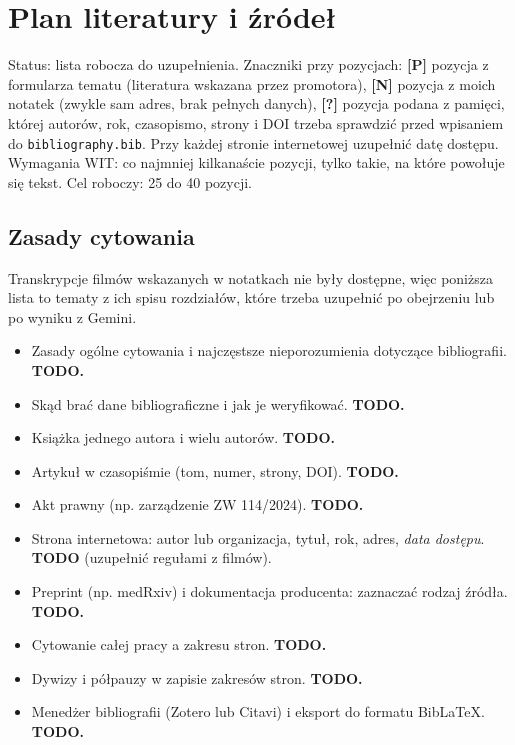 \section{Plan literatury i źródeł}

Status: lista robocza do uzupełnienia. Znaczniki przy pozycjach:
\textbf{[P]} pozycja z formularza tematu (literatura wskazana przez promotora),
\textbf{[N]} pozycja z moich notatek (zwykle sam adres, brak pełnych danych),
\textbf{[?]} pozycja podana z pamięci, której autorów, rok, czasopismo,
strony i DOI trzeba sprawdzić przed wpisaniem do \texttt{bibliography.bib}.
Przy każdej stronie internetowej uzupełnić datę dostępu.
Wymagania WIT: co najmniej kilkanaście pozycji, tylko takie, na które
powołuje się tekst. Cel roboczy: 25 do 40 pozycji.

\subsection{Zasady cytowania}

Transkrypcje filmów wskazanych w notatkach nie były dostępne, więc poniższa
lista to tematy z ich spisu rozdziałów, które trzeba uzupełnić po obejrzeniu
lub po wyniku z Gemini.

\begin{itemize}
    \item Zasady ogólne cytowania i najczęstsze nieporozumienia
          dotyczące bibliografii. \textbf{TODO.}
    \item Skąd brać dane bibliograficzne i jak je weryfikować. \textbf{TODO.}
    \item Książka jednego autora i wielu autorów. \textbf{TODO.}
    \item Artykuł w czasopiśmie (tom, numer, strony, DOI). \textbf{TODO.}
    \item Akt prawny (np. zarządzenie ZW 114/2024). \textbf{TODO.}
    \item Strona internetowa: autor lub organizacja, tytuł, rok, adres,
          \emph{data dostępu}. \textbf{TODO} (uzupełnić regułami z filmów).
    \item Preprint (np. medRxiv) i dokumentacja producenta: zaznaczać
          rodzaj źródła. \textbf{TODO.}
    \item Cytowanie całej pracy a zakresu stron. \textbf{TODO.}
    \item Dywizy i półpauzy w zapisie zakresów stron. \textbf{TODO.}
    \item Menedżer bibliografii (Zotero lub Citavi) i eksport do formatu
          BibLaTeX. \textbf{TODO.}
\end{itemize}

